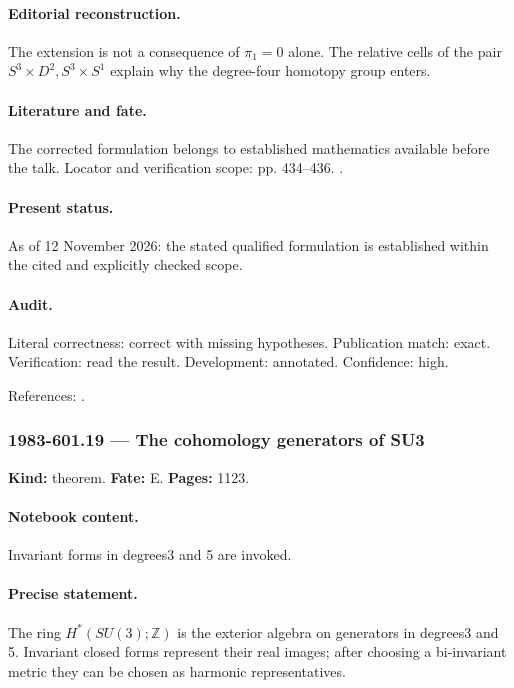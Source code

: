 \paragraph{Editorial reconstruction.} The extension is not a consequence of \(\pi_1=0\) alone. The relative cells of the pair \(S^3\times D^2,S^3\times S^1\) explain why the degree-four homotopy group enters.

\paragraph{Literature and fate.} The corrected formulation belongs to established mathematics available before the talk. Locator and verification scope: pp. 434--436. \cite{witten1983current}.

\paragraph{Present status.} As of 12 November 2026: the stated qualified formulation is established within the cited and explicitly checked scope.

\paragraph{Audit.} Literal correctness: correct with missing hypotheses. Publication match: exact. Verification: read the result. Development: annotated. Confidence: high.

\noindent References: \citep{witten1983current}.\par

\subsubsection{1983-601.19 --- The cohomology generators of SU3}

\label{item:1983-601.19}

\noindent\textbf{Kind:} theorem. \textbf{Fate:} E. \textbf{Pages:} 1123.\par

\paragraph{Notebook content.} Invariant forms in degrees3 and 5 are invoked.

\paragraph{Precise statement.} The ring \(H^*(SU(3);\mathbb Z)\) is the exterior algebra on generators in degrees3 and 5. Invariant closed forms represent their real images; after choosing a bi-invariant metric they can be chosen as harmonic representatives.

